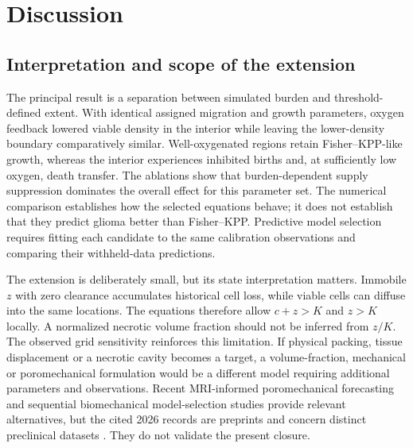 \section{Discussion}
\subsection{Interpretation and scope of the extension}
The principal result is a separation between simulated burden and threshold-defined extent. With identical assigned migration and growth parameters, oxygen feedback lowered viable density in the interior while leaving the lower-density boundary comparatively similar. Well-oxygenated regions retain Fisher--KPP-like growth, whereas the interior experiences inhibited births and, at sufficiently low oxygen, death transfer. The ablations show that burden-dependent supply suppression dominates the overall effect for this parameter set. The numerical comparison establishes how the selected equations behave; it does not establish that they predict glioma better than Fisher--KPP. Predictive model selection requires fitting each candidate to the same calibration observations and comparing their withheld-data predictions.

The extension is deliberately small, but its state interpretation matters. Immobile $z$ with zero clearance accumulates historical cell loss, while viable cells can diffuse into the same locations. The equations therefore allow $c+z>K$ and $z>K$ locally. A normalized necrotic volume fraction should not be inferred from $z/K$. The observed grid sensitivity reinforces this limitation. If physical packing, tissue displacement or a necrotic cavity becomes a target, a volume-fraction, mechanical or poromechanical formulation would be a different model requiring additional parameters and observations. Recent MRI-informed poromechanical forecasting and sequential biomechanical model-selection studies provide relevant alternatives, but the cited 2026 records are preprints and concern distinct preclinical datasets \citep{andaloussi2026,noman2026}. They do not validate the present closure.

